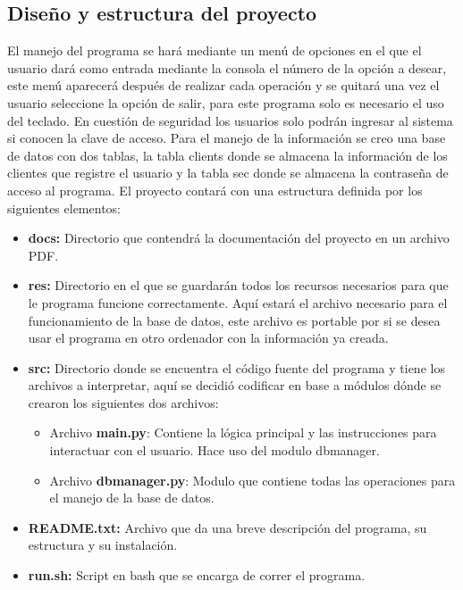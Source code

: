 \documentclass[12pt]{article}
\begin{document}
		\subsection{Diseño y estructura del proyecto}
			El manejo del programa se hará mediante un menú de opciones en el que el usuario dará como entrada mediante la consola el número de la opción a desear, este menú aparecerá después de realizar cada operación y se quitará una vez el usuario seleccione la opción de salir, para este programa solo es necesario el uso del teclado. En cuestión de seguridad los usuarios solo podrán ingresar al sistema si conocen la clave de acceso. Para el manejo de la información se creo una base de datos con dos tablas, la tabla clients donde se almacena la información de los clientes que registre el usuario y la tabla sec donde se almacena la contraseña de acceso al programa.
			El proyecto contará con una estructura definida por los siguientes elementos:
			\begin{itemize}
				 \item\textbf{ docs:} Directorio que contendrá la documentación del proyecto en un archivo PDF.
				\item \textbf{ res:} Directorio en el que se guardarán todos los recursos necesarios para que le programa funcione correctamente. Aquí estará el archivo necesario para el funcionamiento de la base de datos, este archivo es portable por si se desea usar el programa en otro ordenador con la información ya creada. 
				\item \textbf{ src:} Directorio donde se encuentra el código fuente del programa y tiene los archivos a interpretar, aquí se decidió codificar en base a módulos dónde se crearon los siguientes dos archivos:
				\begin{itemize}
	  			\item Archivo \textbf{main.py}: Contiene la lógica principal y las instrucciones para interactuar con el usuario. Hace uso del modulo dbmanager.
	  			\item Archivo \textbf{dbmanager.py}: Modulo que contiene todas las operaciones para el manejo de la base de datos.
	  			
				\end{itemize}	
				
				\item \textbf{README.txt:} Archivo que da una breve descripción del programa, su estructura y su instalación.
				\item \textbf{run.sh:} Script en bash que se encarga de correr el programa.
			\end{itemize}
		\newpage
\end{document}
